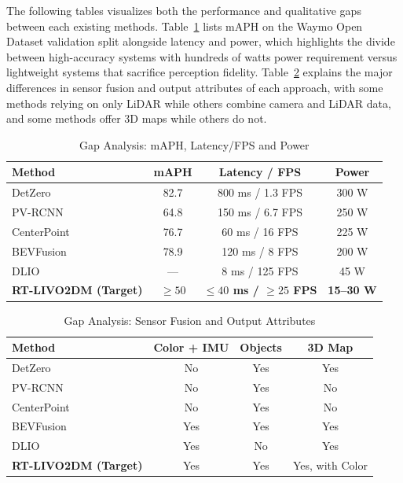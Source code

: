The following tables visualizes both the performance and qualitative gaps between each existing methods. Table~\ref{tab:gap_perf} lists mAPH on the Waymo Open Dataset validation split alongside latency and power, which highlights the divide between high-accuracy systems with hundreds of watts power requirement versus lightweight systems that sacrifice perception fidelity. Table~\ref{tab:gap_attrs} explains the major differences in sensor fusion and output attributes of each approach, with some methods relying on only LiDAR while others combine camera and LiDAR data, and some methods offer 3D maps while others do not.
\begin{table}[h!]
    \centering
    \caption{Gap Analysis: mAPH, Latency/FPS and Power}
    \begin{tabular}{lccc}
        \toprule
        \textbf{Method} & \textbf{mAPH} & \textbf{Latency / FPS} & \textbf{Power} \\
        \midrule
        DetZero     & 82.7 & 800 ms / 1.3 FPS & 300 W \\
        PV-RCNN     & 64.8 & 150 ms / 6.7 FPS & 250 W \\
        CenterPoint & 76.7 & 60 ms / 16 FPS  & 225 W \\
        BEVFusion   & 78.9 & 120 ms / 8 FPS  & 200 W \\
        DLIO        & —    & 8 ms / 125 FPS  & 45 W  \\
        \midrule
        \textbf{RT-LIVO2DM (Target)} & \textbf{$\geq 50$} & \textbf{$\leq 40$ ms / $\geq 25$ FPS} & \textbf{15--30 W} \\
        \bottomrule
    \end{tabular}
    \label{tab:gap_perf}
\end{table}

\begin{table}[h!]
    \centering
    \caption{Gap Analysis: Sensor Fusion and Output Attributes}
    \begin{tabular}{lccc}
        \toprule
        \textbf{Method} & \textbf{Color + IMU} & \textbf{Objects} & \textbf{3D Map} \\
        \midrule
        DetZero     & No  & Yes & Yes \\
        PV-RCNN     & No  & Yes & No  \\
        CenterPoint & No  & Yes & No  \\
        BEVFusion   & Yes & Yes & Yes \\
        DLIO        & Yes & No  & Yes \\
        \midrule
        \textbf{RT-LIVO2DM (Target)} & Yes & Yes & Yes, with Color \\
        \bottomrule
    \end{tabular}
    \label{tab:gap_attrs}
\end{table}

